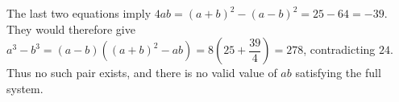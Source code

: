 The last two equations imply $4ab=(a+b)^2-(a-b)^2=25-64=-39$. They would therefore give $a^3-b^3=(a-b)((a+b)^2-ab)=8\left(25+\dfrac{39}{4}\right)=278$, contradicting $24$. Thus no such pair exists, and there is no valid value of $ab$ satisfying the full system.
